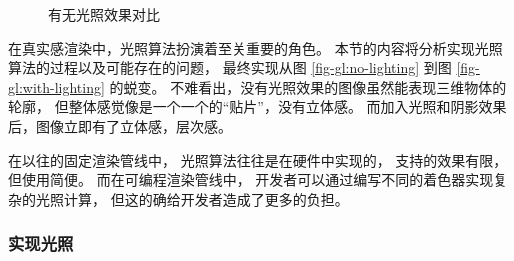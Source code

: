 \documentclass[fontset=windows]{ctexart}
\begin{document}
\begin{figure}[htbp]
    \centering
    \caption{有无光照效果对比}
    \label{fig-gl:lighting-compare}
\end{figure}

在真实感渲染中，光照算法扮演着至关重要的角色。
本节的内容将分析实现光照算法的过程以及可能存在的问题，
最终实现从图 \ref{fig-gl:no-lighting} 到图 \ref{fig-gl:with-lighting} 的蜕变。
不难看出，没有光照效果的图像虽然能表现三维物体的轮廓，
但整体感觉像是一个一个的“贴片”，没有立体感。
而加入光照和阴影效果后，图像立即有了立体感，层次感。

在以往的固定渲染管线中，
光照算法往往是在硬件中实现的，
支持的效果有限，但使用简便。
而在可编程渲染管线中，
开发者可以通过编写不同的着色器实现复杂的光照计算，
但这的确给开发者造成了更多的负担。

\subsubsection{实现光照}
\end{document}

